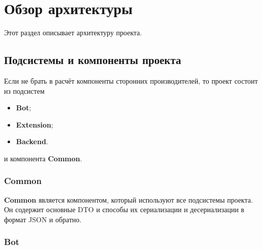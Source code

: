 \newcommand{\Bot}{Bot}
\newcommand{\Extension}{Extension}
\newcommand{\Backend}{Backend}
\newcommand{\Common}{Common}

\newcommand{\Botbf}{\textbf{\Bot}}
\newcommand{\Extensionbf}{\textbf{\Extension}}
\newcommand{\Backendbf}{\textbf{\Backend}}
\newcommand{\Commonbf}{\textbf{\Common}}

\chapter{Обзор архитектуры}
	\label{chapter4}

	Этот раздел описывает архитектуру проекта.

	\section{Подсистемы и компоненты проекта}
		Если не брать в расчёт компоненты сторонних производителей, то проект состоит из подсистем
		
		\begin{itemize}
			\item \Botbf;
			
			\item \Extensionbf;
			
			\item \Backendbf.
		\end{itemize}
		и компонента \Commonbf.
			
		\subsection{\Common}
			\begin{figure}[H]
				\centering
				\def\svgwidth{\columnwidth}
				
			\end{figure}
			
			\Commonbf{} является компонентом, который используют все подсистемы проекта. Он содержит основные DTO и способы их сериализации и десериализации в формат JSON и обратно.
		\subsection{\Bot{}}
			\begin{figure}[H]
				\centering
				\def\svgwidth{\columnwidth}
				
			\end{figure}
			
